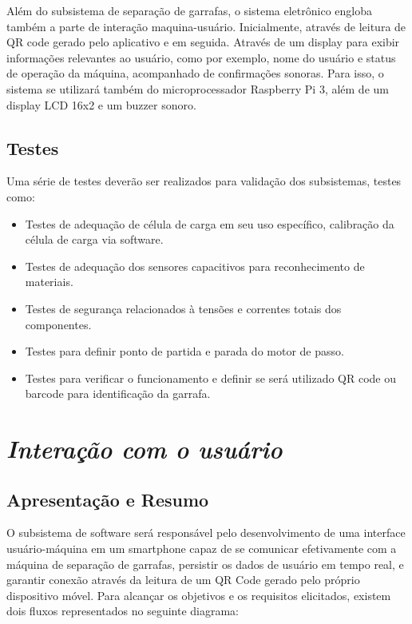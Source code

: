     Além do subsistema de separação de garrafas, o sistema eletrônico engloba também a parte de interação maquina-usuário. Inicialmente, através de leitura de QR code gerado pelo aplicativo e em seguida. Através de um display para exibir informações relevantes ao usuário, como por exemplo, nome do usuário e status de operação da máquina, acompanhado de confirmações sonoras. Para isso, o sistema se utilizará também do microprocessador Raspberry Pi 3, além de um display LCD 16x2 e um buzzer sonoro.

\subsection{Testes}

    Uma série de testes deverão ser realizados para validação dos subsistemas, testes como:

\begin{itemize}
\item Testes de adequação de célula de carga em seu uso específico, calibração da célula de carga via software.
\item Testes de adequação dos sensores capacitivos para reconhecimento de materiais.
\item Testes de segurança relacionados à tensões e correntes totais dos componentes.
\item Testes para definir ponto de partida e parada do motor de passo.
\item Testes para verificar o funcionamento e definir se será utilizado QR code ou barcode para identificação da garrafa.
\end{itemize}

\section{\textit{Interação com o usuário}}

\subsection{Apresentação e Resumo}
    O subsistema de software será responsável pelo desenvolvimento de uma interface usuário-máquina em um smartphone capaz de se comunicar efetivamente com a máquina de separação de garrafas, persistir os dados de usuário em tempo real, e garantir conexão através da leitura de um QR Code gerado pelo próprio dispositivo móvel. Para alcançar os objetivos e os requisitos elicitados, existem dois fluxos representados no seguinte diagrama:

